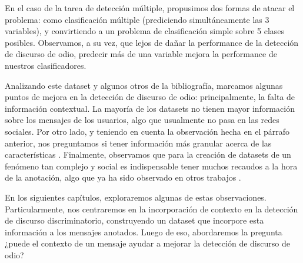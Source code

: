 En el caso de la tarea de detección múltiple, propusimos dos formas de atacar el problema: como clasificación múltiple (prediciendo simultáneamente las 3 variables), y convirtiendo a un problema de clasificación simple sobre 5 clases posibles. Observamos, a su vez, que lejos de dañar la performance de la detección de discurso de odio, predecir más de una variable mejora la performance de nuestros clasificadores.

Analizando este dataset y algunos otros de la bibliografía, marcamos algunas puntos de mejora en la detección de discurso de odio: principalmente, la falta de información contextual. La mayoría de los datasets no tienen mayor información sobre los mensajes de los usuarios, algo que usualmente no pasa en las redes sociales. Por otro lado, y teniendo en cuenta la observación hecha en el párrafo anterior, nos preguntamos si tener información más granular acerca de las características . Finalmente, observamos que para la creación de datasets de un fenómeno tan complejo y social es indispensable tener muchos recaudos a la hora de la anotación, algo que ya ha sido observado en otros trabajos .

En los siguientes capítulos, exploraremos algunas de estas observaciones. Particularmente, nos centraremos en la incorporación de contexto en la detección de discurso discriminatorio, construyendo un dataset que incorpore esta información a los mensajes anotados. Luego de eso, abordaremos la pregunta ¿puede el contexto de un mensaje ayudar a mejorar la detección de discurso de odio?